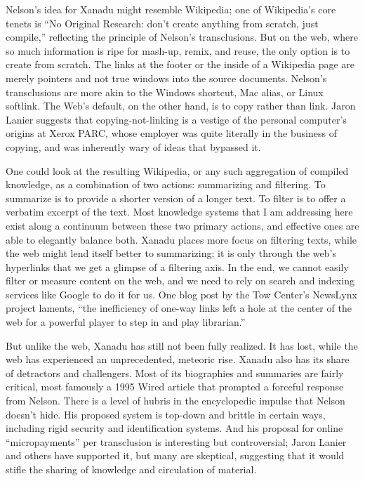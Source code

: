 Nelson’s idea for Xanadu might resemble Wikipedia; one of Wikipedia’s core tenets is “No Original Research: don’t create anything from scratch, just compile,” reflecting the principle of Nelson’s transclusions.  But on the web, where so much information is ripe for mash-up, remix, and reuse, the only option is to create from scratch. The links at the footer or the inside of a Wikipedia page are merely pointers and not true windows into the source documents. Nelson’s transclusions are more akin to the Windows shortcut, Mac alias, or Linux softlink. The Web’s default, on the other hand, is to copy rather than link. Jaron Lanier suggests that copying-not-linking is a vestige of the personal computer’s origins at Xerox PARC, whose employer was quite literally in the business of copying, and was inherently wary of ideas that bypassed it. 

One could look at the resulting Wikipedia, or any such aggregation of compiled knowledge, as a combination of two actions: summarizing and filtering. To summarize is to provide a shorter version of a longer text. To filter is to offer a verbatim excerpt of the text. Most knowledge systems that I am addressing here exist along a continuum between these two primary actions, and effective ones are able to elegantly balance both. Xanadu places more focus on filtering texts, while the web might lend itself better to summarizing; it is only through the web’s hyperlinks that we get a glimpse of a filtering axis. In the end, we cannot easily filter or measure content on the web, and we need to rely on search and indexing services like Google to do it for us. One blog post by the Tow Center’s NewsLynx project laments, “the inefficiency of one-way links left a hole at the center of the web for a powerful player to step in and play librarian.” 

But unlike the web, Xanadu has still not been fully realized. It has lost, while the web has experienced an unprecedented, meteoric rise. Xanadu also has its share of detractors and challengers. Most of its biographies and summaries are fairly critical, most famously a 1995 Wired article that prompted a forceful response from Nelson.  There is a level of hubris in the encyclopedic impulse that Nelson doesn’t hide. His proposed system is top-down and brittle in certain ways, including rigid security and identification systems. And his proposal for online “micropayments” per transclusion is interesting but controversial; Jaron Lanier and others have supported it, but many are skeptical, suggesting that it would stifle the sharing of knowledge and circulation of material. 

